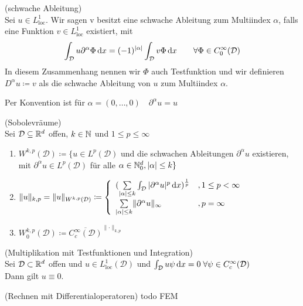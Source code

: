\begin{Definition}(schwache Ableitung)\\
	Sei $u \in L_{\text{loc}}^1$. Wir sagen v besitzt eine schwache Ableitung zum Multiindex $\alpha$, falls eine Funktion $v \in L_{\text{loc}}^1$ existiert, mit 
		\begin{align*}
			\int_{\mathcal{D}} u \partial^{\alpha} \Phi \, \mathrm{d} x = (-1)^{|\alpha|} \int_{\mathcal{D}} v \Phi \, \mathrm{d} x \qquad \forall \Phi \in C_0^{\infty}(\mathcal{D})
		\end{align*}
	In diesem Zusammenhang nennen wir $\Phi$ auch Testfunktion und wir definieren $D^{\alpha} u \coloneqq v$ als die schwache Ableitung von $u$ zum Multiindex $\alpha$. 
\end{Definition}
\begin{Bemerkung}
	Per Konvention ist für $ \alpha = (0,\dots, 0) \quad \partial^{\alpha}u = u $
\end{Bemerkung}
\begin{Definition}(Sobolevräume)\\
	Sei $\mathcal{D} \subseteq \mathbb{R}^d $ offen, $ k \in \mathbb{N} $ und $ 1 \leq p \leq \infty $ 
	\begin{enumerate}[label=(\alph*)]
		\item $ W^{k,p} (\mathcal{D}) \coloneqq \{ u \in L^p(\mathcal{D})$ und die schwachen Ableitungen $ \partial^{\alpha}u $ existieren, mit $ \partial^{\alpha}u \in L^p(\mathcal{D}) $ für alle $ \alpha \in \mathbb{N}_0^d , |\alpha| \leq k \} $	
		\item $ \lVert u \rVert_{k,p} =  \lVert u \rVert_{W^{k,p}(\mathcal{D})} \coloneqq 
				\begin{cases}
					\begin{array}{lll}
						(\sum\limits_{|\alpha|\leq k} \int_{\mathcal{D}} |\partial^{\alpha} u |^p \, \mathrm{d} x)^{\frac{1}{p}} &, 1 \leq p < \infty \\
						\sum\limits_{|\alpha|\leq k}   \lVert \partial^{\alpha} u \rVert_{\infty}        &, p = \infty
					\end{array}
				\end{cases}  $
		\item $ W_0^{k,p}(\mathcal{D}) \coloneqq \overline{ C_c^{\infty}(\mathcal{D}) }^{\lVert \cdot \rVert_{k,p}} $
	\end{enumerate}
\end{Definition}

\begin{Satz}(Multiplikation mit Testfunktionen und Integration) \\
	Sei $\mathcal{D} \subset \mathbb{R}^d$ offen und $u \in L_{\text{loc}}^1(\mathcal{D})$ und $\int_{\mathcal{D}} u \psi \, \mathrm{d} x = 0 \; \forall \psi \in C_c^{\infty}(\mathcal{D})$ \\
	Dann gilt $ u \equiv 0 $.
\end{Satz}
\begin{Satz} (Rechnen mit Differentialoperatoren)
	todo FEM
\end{Satz}